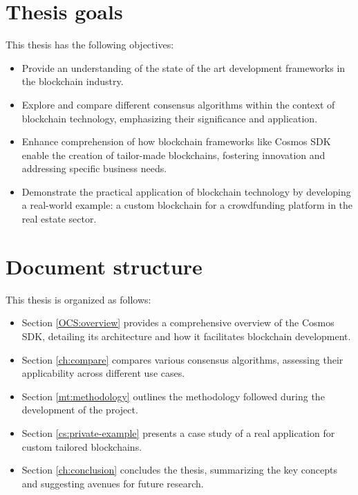 \section{Thesis goals}

This thesis has the following objectives:

\begin{itemize}
    \item Provide an understanding of the state of the art development frameworks in the blockchain industry.
    \item Explore and compare different consensus algorithms within the context of blockchain technology, emphasizing their significance and application.
    \item Enhance comprehension of how blockchain frameworks like Cosmos SDK enable the creation of tailor-made blockchains, fostering innovation and addressing specific business needs.
    \item Demonstrate the practical application of blockchain technology by developing a real-world example: a custom blockchain for a crowdfunding platform in the real estate sector.
\end{itemize}

\section{Document structure}

This thesis is organized as follows:

\begin{itemize}
    \item Section \ref{OCS:overview} provides a comprehensive overview of the Cosmos SDK, detailing its architecture and how it facilitates blockchain development.
    \item Section \ref{ch:compare} compares various consensus algorithms, assessing their applicability across different use cases.
    \item Section \ref{mt:methodology} outlines the methodology followed during the development of the project.
    \item Section \ref{cs:private-example} presents a case study of a real application for custom tailored blockchains.
    \item Section \ref{ch:conclusion} concludes the thesis, summarizing the key concepts and suggesting avenues for future research.
\end{itemize}
